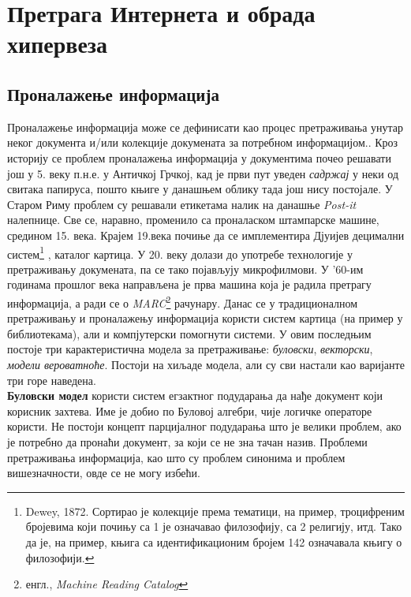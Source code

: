 \section{Претрага Интернета и обрада хипервеза}
\subsection{Проналажење информација}
Проналажење информација може се дефинисати као процес претраживања унутар неког документа и/или колекције докумената за потребном информацијом.\cite{langville2011google}. Кроз историју се проблем проналажења информација у документима почео решавати још у 5. веку п.н.е. у Античкој Грчкој, кад је први пут уведен \emph{садржај} у неки од свитака папируса, пошто књиге у данашњем облику тада још нису постојале. У Старом Риму проблем су решавали етикетама налик на данашње \emph{Post-it} налепнице. Све се, наравно, променило са проналаском штампарске машине, средином 15. века. Крајем 19.века почиње да се имплементира Дјуијев децимални систем\footnote{Dewey, 1872. Сортирао је колекције према тематици, на пример, троцифреним бројевима који почињу са 1 је означавао филозофију, са 2 религију, итд. Тако да је, на пример, књига са идентификационим бројем 142 означавала књигу о филозофији.} , каталог картица. У 20. веку долази до употребе технологије у претраживању докумената, па се тако појављују микрофилмови. У '60-им годинама прошлог века направљена је прва машина која је радила претрагу информација, а ради се о \emph{MARC}\footnote{енгл., \emph{Machine Reading Catalog}} рачунару. Данас се у традиционалном претраживању и проналажењу информација користи систем картица (на пример у библиотекама), али и компјутерски помогнути системи. У овим последњим постоје три карактеристична модела за претраживање: \emph{буловски}, \emph{векторски}, \emph{модели вероватноће}\cite[Ch 1.2]{langville2011google}. Постоји на хиљаде модела, али су сви настали као варијанте три горе наведена.\\
\textbf{Буловски модел} користи систем егзактног подударања да нађе документ који корисник захтева. Име је добио по Буловој алгебри, чије логичке операторе користи. Не постоји концепт парцијалног подударања што је велики проблем, ако је потребно да пронаћи документ, за који се не зна тачан назив. Проблеми претраживања информација, као што су проблем синонима и проблем вишезначности, овде се не могу избећи. \\
